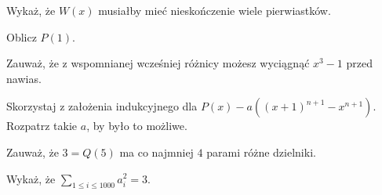 
\begin{hints_list}
	\item Wykaż, że $W(x)$ musiałby mieć nieskończenie wiele pierwiastków.
	\item Oblicz $P(1)$.
	\item Zauważ, że z wspomnianej wcześniej różnicy możesz wyciągnąć $x^3 - 1$ przed nawias.
	\item Skorzystaj z założenia indukcyjnego dla $P(x) - a\left((x + 1)^{n + 1} - x^{n + 1} \right)$. Rozpatrz takie $a$, by było to możliwe.
	\item Zauważ, że $3 = Q(5)$ ma co najmniej $4$ parami różne dzielniki.
	\item *
	\item Wykaż, że $\sum_{1 \leqslant i \leqslant 1000} a_i^2 = 3$.
\end{hints_list}
